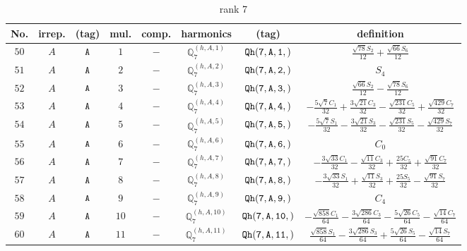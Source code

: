 \documentclass[fleqn,8pt]{jsarticle}
\begin{document}
\begin{table}[ht!]
\begin{center}
\caption{rank 7}
\renewcommand{\arraystretch}{1.3}
\begin{tabular}{cccccccc} \hline \hline
No. & irrep. & (tag) & mul. & comp. & harmonics & (tag) & definition \\ \hline
$ 50 $ & $ A $ & $ {\tt A} $ & $ 1 $ & $ - $ & $ \mathbb{Q}_{7}^{(h,A,1)} $ & $ {\tt Qh(7,A,1,)} $ & $ \frac{\sqrt{78} S_{2}}{12} + \frac{\sqrt{66} S_{6}}{12} $ \\
$ 51 $ & $ A $ & $ {\tt A} $ & $ 2 $ & $ - $ & $ \mathbb{Q}_{7}^{(h,A,2)} $ & $ {\tt Qh(7,A,2,)} $ & $ S_{4} $ \\
$ 52 $ & $ A $ & $ {\tt A} $ & $ 3 $ & $ - $ & $ \mathbb{Q}_{7}^{(h,A,3)} $ & $ {\tt Qh(7,A,3,)} $ & $ \frac{\sqrt{66} S_{2}}{12} - \frac{\sqrt{78} S_{6}}{12} $ \\
$ 53 $ & $ A $ & $ {\tt A} $ & $ 4 $ & $ - $ & $ \mathbb{Q}_{7}^{(h,A,4)} $ & $ {\tt Qh(7,A,4,)} $ & $ - \frac{5 \sqrt{7} C_{1}}{32} + \frac{3 \sqrt{21} C_{3}}{32} - \frac{\sqrt{231} C_{5}}{32} + \frac{\sqrt{429} C_{7}}{32} $ \\
$ 54 $ & $ A $ & $ {\tt A} $ & $ 5 $ & $ - $ & $ \mathbb{Q}_{7}^{(h,A,5)} $ & $ {\tt Qh(7,A,5,)} $ & $ - \frac{5 \sqrt{7} S_{1}}{32} - \frac{3 \sqrt{21} S_{3}}{32} - \frac{\sqrt{231} S_{5}}{32} - \frac{\sqrt{429} S_{7}}{32} $ \\
$ 55 $ & $ A $ & $ {\tt A} $ & $ 6 $ & $ - $ & $ \mathbb{Q}_{7}^{(h,A,6)} $ & $ {\tt Qh(7,A,6,)} $ & $ C_{0} $ \\
$ 56 $ & $ A $ & $ {\tt A} $ & $ 7 $ & $ - $ & $ \mathbb{Q}_{7}^{(h,A,7)} $ & $ {\tt Qh(7,A,7,)} $ & $ - \frac{3 \sqrt{33} C_{1}}{32} - \frac{\sqrt{11} C_{3}}{32} + \frac{25 C_{5}}{32} + \frac{\sqrt{91} C_{7}}{32} $ \\
$ 57 $ & $ A $ & $ {\tt A} $ & $ 8 $ & $ - $ & $ \mathbb{Q}_{7}^{(h,A,8)} $ & $ {\tt Qh(7,A,8,)} $ & $ - \frac{3 \sqrt{33} S_{1}}{32} + \frac{\sqrt{11} S_{3}}{32} + \frac{25 S_{5}}{32} - \frac{\sqrt{91} S_{7}}{32} $ \\
$ 58 $ & $ A $ & $ {\tt A} $ & $ 9 $ & $ - $ & $ \mathbb{Q}_{7}^{(h,A,9)} $ & $ {\tt Qh(7,A,9,)} $ & $ C_{4} $ \\
$ 59 $ & $ A $ & $ {\tt A} $ & $ 10 $ & $ - $ & $ \mathbb{Q}_{7}^{(h,A,10)} $ & $ {\tt Qh(7,A,10,)} $ & $ - \frac{\sqrt{858} C_{1}}{64} - \frac{3 \sqrt{286} C_{3}}{64} - \frac{5 \sqrt{26} C_{5}}{64} - \frac{\sqrt{14} C_{7}}{64} $ \\
$ 60 $ & $ A $ & $ {\tt A} $ & $ 11 $ & $ - $ & $ \mathbb{Q}_{7}^{(h,A,11)} $ & $ {\tt Qh(7,A,11,)} $ & $ \frac{\sqrt{858} S_{1}}{64} - \frac{3 \sqrt{286} S_{3}}{64} + \frac{5 \sqrt{26} S_{5}}{64} - \frac{\sqrt{14} S_{7}}{64} $ \\

\end{tabular}
\end{center}
\end{table}
\end{document}
